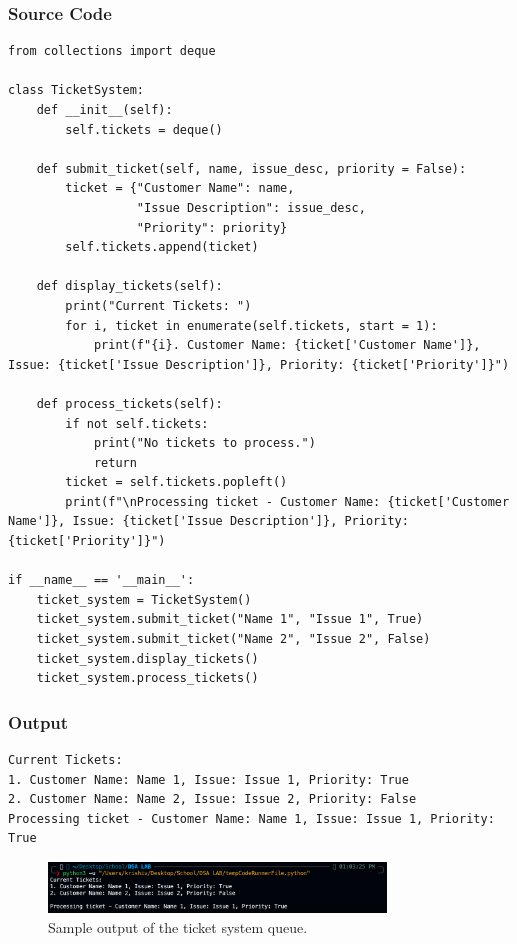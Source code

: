 \documentclass[a4paper,12pt]{article}
\begin{document}
\subsubsection*{Source Code}
\begin{lstlisting}
from collections import deque

class TicketSystem:
    def __init__(self):
        self.tickets = deque()

    def submit_ticket(self, name, issue_desc, priority = False):
        ticket = {"Customer Name": name, 
                  "Issue Description": issue_desc, 
                  "Priority": priority}
        self.tickets.append(ticket)

    def display_tickets(self):
        print("Current Tickets: ")
        for i, ticket in enumerate(self.tickets, start = 1):
            print(f"{i}. Customer Name: {ticket['Customer Name']}, Issue: {ticket['Issue Description']}, Priority: {ticket['Priority']}")

    def process_tickets(self):
        if not self.tickets:
            print("No tickets to process.")
            return
        ticket = self.tickets.popleft()
        print(f"\nProcessing ticket - Customer Name: {ticket['Customer Name']}, Issue: {ticket['Issue Description']}, Priority: {ticket['Priority']}")

if __name__ == '__main__':
    ticket_system = TicketSystem()
    ticket_system.submit_ticket("Name 1", "Issue 1", True)
    ticket_system.submit_ticket("Name 2", "Issue 2", False)
    ticket_system.display_tickets()
    ticket_system.process_tickets()
\end{lstlisting}

\subsubsection*{Output}
\begin{verbatim}
Current Tickets: 
1. Customer Name: Name 1, Issue: Issue 1, Priority: True
2. Customer Name: Name 2, Issue: Issue 2, Priority: False
Processing ticket - Customer Name: Name 1, Issue: Issue 1, Priority: True
\end{verbatim}

\begin{figure}[h]
    \centering
    \includegraphics[width=0.8\textwidth]{output_screenshot_exp3.png}
    \caption{Sample output of the ticket system queue.}
    \label{fig:output_exp3}
\end{figure}
\end{document}
